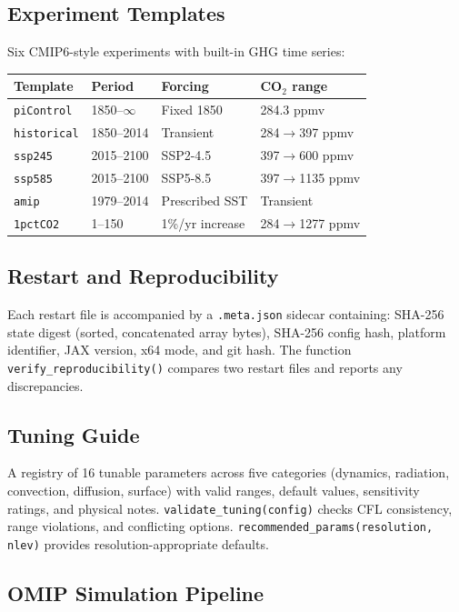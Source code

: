 \documentclass[11pt,a4paper]{article}
\begin{document}
\subsection{Experiment Templates}

Six CMIP6-style experiments with built-in GHG time series:

\begin{center}
\begin{tabular}{llll}
\toprule
Template & Period & Forcing & CO$_2$ range \\
\midrule
\texttt{piControl} & 1850--$\infty$ & Fixed 1850 & 284.3 ppmv \\
\texttt{historical} & 1850--2014 & Transient & 284$\to$397 ppmv \\
\texttt{ssp245} & 2015--2100 & SSP2-4.5 & 397$\to$600 ppmv \\
\texttt{ssp585} & 2015--2100 & SSP5-8.5 & 397$\to$1135 ppmv \\
\texttt{amip} & 1979--2014 & Prescribed SST & Transient \\
\texttt{1pctCO2} & 1--150 & 1\%/yr increase & 284$\to$1277 ppmv \\
\bottomrule
\end{tabular}
\end{center}

\subsection{Restart and Reproducibility}

Each restart file is accompanied by a \texttt{.meta.json} sidecar containing:
SHA-256 state digest (sorted, concatenated array bytes), SHA-256 config hash,
platform identifier, JAX version, x64 mode, and git hash.
The function \texttt{verify\_reproducibility()} compares two restart files and reports any discrepancies.

\subsection{Tuning Guide}

A registry of 16 tunable parameters across five categories (dynamics, radiation, convection, diffusion, surface) with valid ranges, default values, sensitivity ratings, and physical notes.  \texttt{validate\_tuning(config)} checks CFL consistency, range violations, and conflicting options.  \texttt{recommended\_params(resolution, nlev)} provides resolution-appropriate defaults.

\subsection{OMIP Simulation Pipeline}
\end{document}
